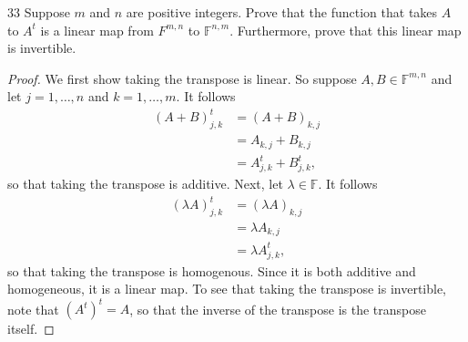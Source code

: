 \documentclass[11pt]{extarticle}
\newenvironment{problem}[1]{\begin{prob*}{#1}{}}{\end{prob*}}
\newcommand{\F}{\mathbb{F}}
\begin{document}
\begin{problem}{33}
Suppose $m$ and $n$ are positive integers.  Prove that the function that takes $A$ to $A^t$ is a linear map from $F^{m,n}$ to $\F^{n,m}$.  Furthermore, prove that this linear map is invertible.
\end{problem}
\begin{proof}
We first show taking the transpose is linear.  So suppose $A,B\in\F^{m,n}$ and let $j = 1,\dots,n$ and $k = 1,\dots,m$.  It follows
\begin{align*}
(A+ B)^t_{j,k} &= (A + B)_{k, j}\\
&= A_{k, j} + B_{k ,j}\\
&= A^t_{j,k} + B^t_{j,k},
\end{align*}
so that taking the transpose is additive.  Next, let $\lambda\in\F$.  It follows
\begin{align*}
(\lambda A)^t_{j,k} &= (\lambda A)_{k, j}\\
&= \lambda A_{k,j}\\
&= \lambda A_{j,k}^t,
\end{align*}
so that taking the transpose is homogenous.  Since it is both additive and homogeneous, it is a linear map.  To see that taking the transpose is invertible, note that $(A^t)^t = A$, so that the inverse of the transpose is the transpose itself.
\end{proof}
\end{document}
